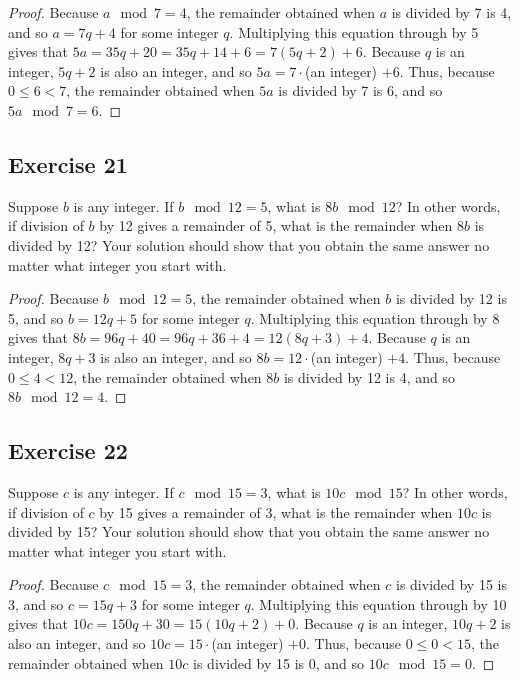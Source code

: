 \documentclass[14pt]{extarticle}
\begin{document}
\begin{proof}
Because $a \mod 7 = 4$, the remainder obtained when $a$ is divided by 7 is 4, and so $a = 7q + 4$ for some integer $q$. Multiplying this equation through by 5 gives that $5a = 35q + 20 = 35q + 14 + 6 = 7(5q + 2) + 6$. Because $q$ is an integer, $5q + 2$ is also an integer, and so $5a = 7\cdot$(an integer) $+ 6$. Thus, because $0 \leq 6 < 7$, the remainder obtained when $5a$ is divided by 7 is 6, and so $5a \mod 7 = 6$.
\end{proof}

\subsection{Exercise 21}
Suppose $b$ is any integer. If $b \mod 12 = 5$, what is $8b \mod 12$? In other words, if division of $b$ by 12 gives a remainder of 5, what is the remainder when $8b$ is divided by 12? Your solution should show that you obtain the same answer no matter what integer you start with.

\begin{proof}
Because $b \mod 12 = 5$, the remainder obtained when $b$ is divided by 12 is 5, and so $b = 12q + 5$ for some integer $q$. Multiplying this equation through by 8 gives that $8b = 96q + 40 = 96q + 36 + 4 = 12(8q + 3) + 4$. Because $q$ is an integer, $8q + 3$ is also an integer, and so $8b = 12\cdot$(an integer) $+ 4$. Thus, because $0 \leq 4 < 12$, the remainder obtained when $8b$ is divided by 12 is 4, and so $8b \mod 12 = 4$.
\end{proof}

\subsection{Exercise 22}
Suppose $c$ is any integer. If $c \mod 15 = 3$, what is $10c \mod 15$? In other words, if division of $c$ by 15 gives a remainder of 3, what is the remainder when $10c$ is divided by 15? Your solution should show that you obtain the same answer no matter what integer you start with.

\begin{proof}
Because $c \mod 15 = 3$, the remainder obtained when $c$ is divided by 15 is 3, and so $c = 15q + 3$ for some integer $q$. Multiplying this equation through by 10 gives that $10c = 150q + 30 = 15(10q + 2) + 0$. Because $q$ is an integer, $10q + 2$ is also an integer, and so $10c = 15\cdot$(an integer) $+ 0$. Thus, because $0 \leq 0 < 15$, the remainder obtained when $10c$ is divided by 15 is 0, and so $10c \mod 15 = 0$.
\end{proof}
\end{document}
